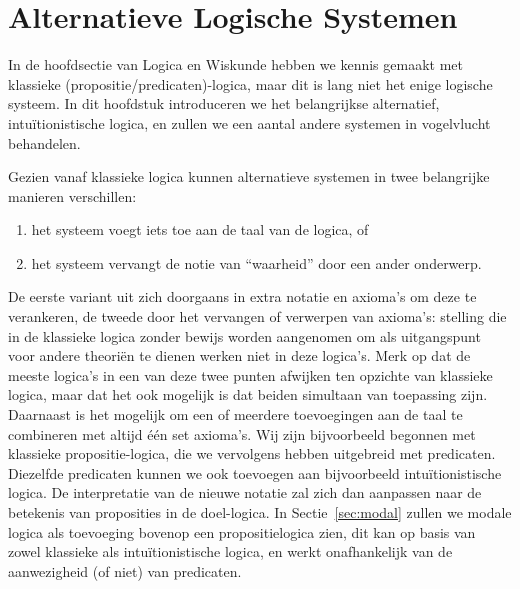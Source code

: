 \chapter{Alternatieve Logische Systemen}\label{ch:systemen}
In de hoofdsectie van Logica en Wiskunde hebben we kennis gemaakt met klassieke (propositie/predicaten)-logica, maar dit is lang niet het enige logische systeem. In dit hoofdstuk introduceren we het belangrijkse alternatief, intu\"itionistische logica, en zullen we een aantal andere systemen in vogelvlucht behandelen.

Gezien vanaf klassieke logica kunnen alternatieve systemen in twee belangrijke manieren verschillen:
\begin{enumerate}
  \item het systeem voegt iets toe aan de taal van de logica, of
  \item het systeem vervangt de notie van \enquote{waarheid} door een ander onderwerp.
\end{enumerate}
De eerste variant uit zich doorgaans in extra notatie en axioma's om deze te verankeren, de tweede door het vervangen of verwerpen van axioma's: stelling die in de klassieke logica zonder bewijs worden aangenomen om als uitgangspunt voor andere theori\"en te dienen werken niet in deze logica's. Merk op dat de meeste logica's in een van deze twee punten afwijken ten opzichte van klassieke logica, maar dat het ook mogelijk is dat beiden simultaan van toepassing zijn. Daarnaast is het mogelijk om een of meerdere toevoegingen aan de taal te combineren met altijd \'e\'en set axioma's. Wij zijn bijvoorbeeld begonnen met klassieke propositie-logica, die we vervolgens hebben uitgebreid met predicaten. Diezelfde predicaten kunnen we ook toevoegen aan bijvoorbeeld intu\"itionistische logica. De interpretatie van de nieuwe notatie zal zich dan aanpassen naar de betekenis van proposities in de doel-logica. In Sectie~\ref{sec:modal} zullen we modale logica als toevoeging bovenop een propositielogica zien, dit kan op basis van zowel klassieke als intu\"itionistische logica, en werkt onafhankelijk van de aanwezigheid (of niet) van predicaten.

